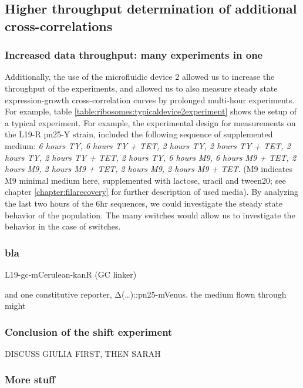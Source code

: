 \subsection*{Higher throughput determination of additional cross-correlations}

%


\subsubsection*{Increased data throughput: many experiments in one}

Additionally, the use of the microfluidic device 2 allowed us to increase the throughput of the experiments, and allowed us to also measure steady state expression-growth cross-correlation curves by prolonged multi-hour experiments.
%
For example, table \ref{table:ribosomes:typicaldevice2experiment} shows the setup of a typical experiment.
For example, the experimental design for measurements on the L19-R pn25-Y strain, included the following sequence of supplemented medium: \textit{6 hours TY, 6 hours TY + TET, 2 hours TY, 2 hours TY + TET, 2 hours TY, 2 hours TY + TET, 2 hours TY, 6 hours M9, 6 hours M9 + TET, 2 hours M9, 2 hours M9 + TET, 2 hours M9, 2 hours M9 + TET}. (M9 indicates M9 minimal medium here, supplemented with lactose, uracil and tween20; see chapter \ref{chapter:filarecovery} for further description of used media). 
%
By analyzing the last two hours of the 6hr sequences, we could investigate the steady state behavior of the population.
The many switches would allow us to investigate the behavior in the case of switches.

\subsubsection*{bla}

L19-gc-mCerulean-kanR (GC linker) 

and one constitutive reporter, Δ(…)::pn25-mVenus.
the medium flown through might 





\subsubsection{Conclusion of the shift experiment}

DISCUSS GIULIA FIRST, THEN SARAH


\subsubsection*{More stuff}

